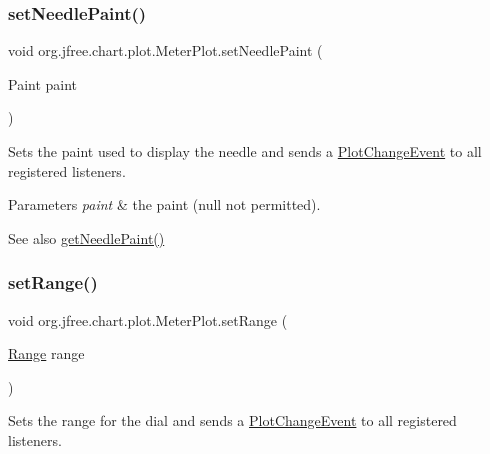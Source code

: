 \subsubsection{\texorpdfstring{set\+Needle\+Paint()}{setNeedlePaint()}}
{\footnotesize\ttfamily void org.\+jfree.\+chart.\+plot.\+Meter\+Plot.\+set\+Needle\+Paint (\begin{DoxyParamCaption}\item[{Paint}]{paint }\end{DoxyParamCaption})}

Sets the paint used to display the needle and sends a \mbox{\hyperlink{}{Plot\+Change\+Event}} to all registered listeners.


\begin{DoxyParams}{Parameters}
{\em paint} & the paint ({\ttfamily null} not permitted).\\
\hline
\end{DoxyParams}
\begin{DoxySeeAlso}{See also}
\mbox{\hyperlink{classorg_1_1jfree_1_1chart_1_1plot_1_1_meter_plot_af41ded0aa388151876aa97f63a39439b}{get\+Needle\+Paint()}} 
\end{DoxySeeAlso}
\mbox{\label{classorg_1_1jfree_1_1chart_1_1plot_1_1_meter_plot_a6f9eba78758e713fcfeeee352d740e2f}} 
\subsubsection{\texorpdfstring{set\+Range()}{setRange()}}
{\footnotesize\ttfamily void org.\+jfree.\+chart.\+plot.\+Meter\+Plot.\+set\+Range (\begin{DoxyParamCaption}\item[{\mbox{\hyperlink{classorg_1_1jfree_1_1data_1_1_range}{Range}}}]{range }\end{DoxyParamCaption})}

Sets the range for the dial and sends a \mbox{\hyperlink{}{Plot\+Change\+Event}} to all registered listeners.


